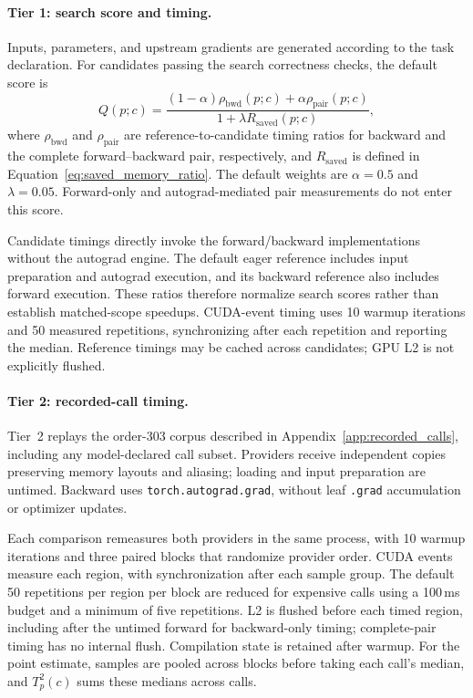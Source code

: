 \paragraph{Tier 1: search score and timing.}
Inputs, parameters, and upstream gradients are generated according to the task declaration. For candidates passing the search correctness checks, the default score is
\begin{equation}
Q(p;c)=
\frac{(1-\alpha)\rho_{\mathrm{bwd}}(p;c)+\alpha\rho_{\mathrm{pair}}(p;c)}
{1+\lambda R_{\mathrm{saved}}(p;c)},
\label{eq:tier1_search_score}
\end{equation}
where $\rho_{\mathrm{bwd}}$ and $\rho_{\mathrm{pair}}$ are reference-to-candidate timing ratios for backward and the complete forward--backward pair, respectively, and $R_{\mathrm{saved}}$ is defined in Equation~\ref{eq:saved_memory_ratio}. The default weights are $\alpha=0.5$ and $\lambda=0.05$. Forward-only and autograd-mediated pair measurements do not enter this score.

Candidate timings directly invoke the forward/backward implementations without the autograd engine. The default eager reference includes input preparation and autograd execution, and its backward reference also includes forward execution. These ratios therefore normalize search scores rather than establish matched-scope speedups. CUDA-event timing uses 10 warmup iterations and 50 measured repetitions, synchronizing after each repetition and reporting the median. Reference timings may be cached across candidates; GPU L2 is not explicitly flushed.

\paragraph{Tier 2: recorded-call timing.}
Tier~2 replays the order-303 corpus described in Appendix~\ref{app:recorded_calls}, including any model-declared call subset. Providers receive independent copies preserving memory layouts and aliasing; loading and input preparation are untimed. Backward uses \texttt{torch.autograd.grad}, without leaf \texttt{.grad} accumulation or optimizer updates.

Each comparison remeasures both providers in the same process, with 10 warmup iterations and three paired blocks that randomize provider order. CUDA events measure each region, with synchronization after each sample group. The default 50 repetitions per region per block are reduced for expensive calls using a 100\,ms budget and a minimum of five repetitions. L2 is flushed before each timed region, including after the untimed forward for backward-only timing; complete-pair timing has no internal flush. Compilation state is retained after warmup. For the point estimate, samples are pooled across blocks before taking each call's median, and $T^2_p(c)$ sums these medians across calls.

